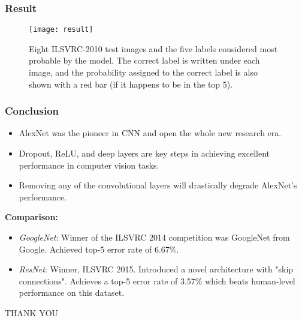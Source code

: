 \documentclass[aspectratio=169, 10pt]{beamer}
\begin{document}
\begin{frame}
	\frametitle{Result}
	\begin{figure}
		\texttt{[image: result]}
		\caption{Eight ILSVRC-2010 test images and the five labels considered most probable by the model. The correct label is written under each image, and the probability assigned to the correct label is also shown with a red bar (if it happens to be in the top 5).}
	\end{figure}

\end{frame}

\begin{frame}
	\frametitle{Conclusion}
	\begin{itemize}
		\item AlexNet was the pioneer in CNN and open the whole new research era.
		\item Dropout, ReLU, and deep layers are key steps in achieving excellent performance in computer vision tasks.
		\item Removing any of the convolutional layers will drastically degrade AlexNet’s performance.
		
	\end{itemize}
	\vspace{8pt}
	\textbf{Comparison:}
	\begin{itemize}
	\item \textit{GoogleNet}: Winner of the ILSVRC 2014 competition was GoogleNet from Google. Achieved top-5 error rate of 6.67\%.\\
	\item \textit{ResNet}: Winner, ILSVRC 2015. Introduced a novel architecture with "skip connections". Achieves a top-5 error rate of 3.57\% which beats human-level performance on this dataset.
	
	\end{itemize}
	
\end{frame}

\begin{frame}
	\vspace{20pt}
	\nocite{7820046}
	\nocite{krizhevsky2017imagenet}
	\nocite{he2016deep}
	
	
	
	
\end{frame}

\begin{frame}[t]{}\vspace{5pt}
\vspace{90pt}
\centering

\Huge THANK YOU
\end{frame}
\end{document}
